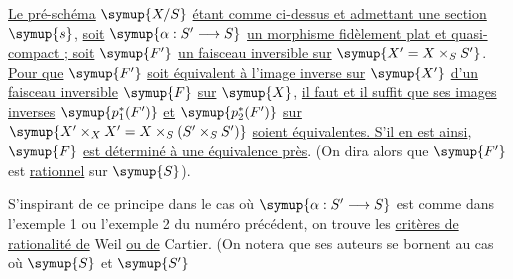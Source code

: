 \uline{Le pré-schéma} $\symup{X/S}$ \uline{étant comme ci-dessus et admettant une section} $\symup{s}$,
\uline{soit} $\symup{\alpha:S'\longrightarrow S}$ \uline{un morphisme fidèlement plat et
quasi-compact ; soit} $\symup{F'}$ \uline{un faisceau inversible sur} $\symup{X'=X\times_SS'}$. \uline{Pour que}
$\symup{F'}$ \uline{soit équivalent à l'image inverse sur} $\symup{X'}$ \uline{d'un faisceau inversible} $\symup{F}$
\uline{sur} $\symup{X}$, \uline{il faut et il suffit que ses images inverses} $\symup{p_1^*(F')}$ \uline{et} $\symup{p_2^*(F')}$
\uline{sur} $\symup{X'\times_XX'=X\times_S(S'\times_SS')}$ \uline{soient équivalentes. S'il en est
ainsi}, $\symup{F}$ \uline{est déterminé à une équivalence près}. (On dira alors que $\symup{F'}$ est
\uline{rationnel} sur $\symup{S}$).

S'inspirant de ce principe dans le cas où
$\symup{\alpha:S'\longrightarrow S}$ est comme dans l'exemple 1 ou l'exemple 2 du
numéro précédent, on trouve les \uline{critères de rationalité de} Weil \uline{ou de} Cartier.
(On notera que ses auteurs se bornent au cas où $\symup{S}$ et $\symup{S'}$

